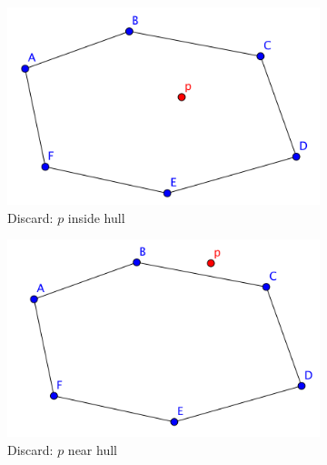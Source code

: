 \begin{figure}[!htb]
\centering
\begin{subfigure}[b]{.33\linewidth}
\includegraphics[width=\linewidth]{point_inside_hull}
\caption{Discard: $p$ inside hull}\label{fig:point_inside_hull}
\end{subfigure}\hspace{20 mm}
\begin{subfigure}[b]{.33\linewidth}
\includegraphics[width=\linewidth]{point_slightly_outside_hull}
\caption{Discard: $p$ near hull}\label{fig:point_slightly_outside_hull}
\end{subfigure}\hspace{20 mm}
\begin{subfigure}[b]{.33\linewidth}

\end{subfigure}
\end{figure}

